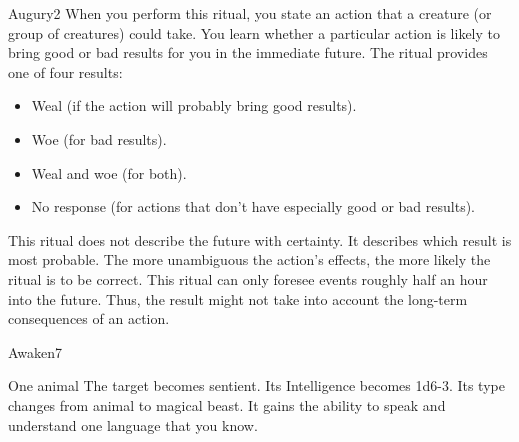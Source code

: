 \begin{spellsection}{Augury}{2}
\spellspecial When you perform this ritual, you state an action that a creature (or group of creatures) could take.
\spelleffect You learn whether a particular action is likely to bring good or bad results for you in the immediate future. The ritual provides one of four results:
\begin{itemize}
    \item Weal (if the action will probably bring good results).
    \item Woe (for bad results).
    \item Weal and woe (for both).
    \item No response (for actions that don't have especially good or bad results).
\end{itemize}

This ritual does not describe the future with certainty. It describes which result is most probable. The more unambiguous the action's effects, the more likely the ritual is to be correct.
\spellnotes This ritual can only foresee events roughly half an hour into the future. Thus, the result might not take into account the long-term consequences of an action.
\end{spellsection}

\begin{spellsection}{Awaken}{7}
\begin{spelltarget}{One animal}
    \spelleffect The target becomes sentient. Its Intelligence becomes 1d6-3. Its type changes from animal to magical beast. It gains the ability to speak and understand one language that you know.
\end{spelltarget}
\end{spellsection}

